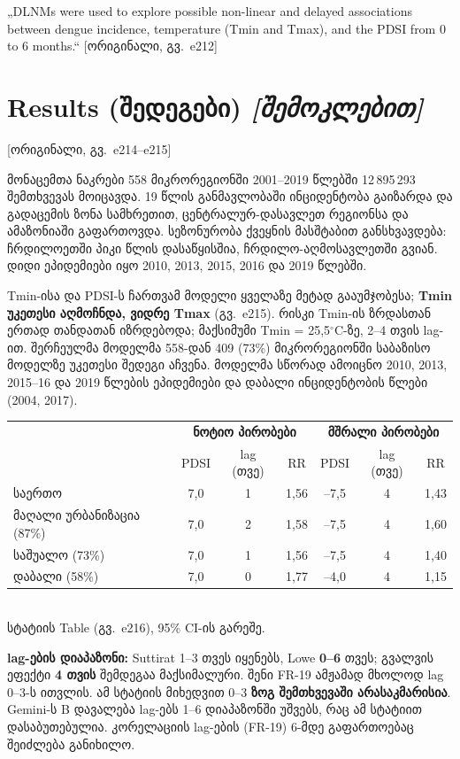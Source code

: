 \documentclass[11pt,a4paper]{article}
\newcommand{\imp}[1]{\textbf{\color{importred}#1}}
\newcommand{\pg}[1]{{\small\color{gray}[ორიგინალი, გვ.~#1]}}
\begin{document}
\begin{citat}
„DLNMs were used to explore possible non-linear and delayed associations between dengue incidence, temperature (Tmin and Tmax), and
the PDSI from 0 to 6 months.“ \pg{e212}
\end{citat}

\section{Results (შედეგები) \textit{[შემოკლებით]}} \pg{e214--e215}

მონაცემთა ნაკრები 558 მიკრორეგიონში 2001--2019 წლებში 12\,895\,293 შემთხვევას მოიცავდა. 19 წლის განმავლობაში ინციდენტობა
გაიზარდა და გადაცემის ზონა სამხრეთით, ცენტრალურ-დასავლეთ რეგიონსა და ამაზონიაში გაფართოვდა. სეზონურობა ქვეყნის მასშტაბით
განსხვავდება: ჩრდილოეთში პიკი წლის დასაწყისშია, ჩრდილო-აღმოსავლეთში გვიან. დიდი ეპიდემიები იყო 2010, 2013, 2015, 2016 და
2019 წლებში.

Tmin-ისა და PDSI-ს ჩართვამ მოდელი ყველაზე მეტად გააუმჯობესა; \textbf{Tmin უკეთესი აღმოჩნდა, ვიდრე Tmax} (გვ.~e215).
რისკი Tmin-ის ზრდასთან ერთად თანდათან იზრდებოდა; მაქსიმუმი Tmin = 25,5$^\circ$C-ზე, 2--4 თვის lag-ით. შერჩეულმა მოდელმა
558-დან 409 (73\%) მიკრორეგიონში საბაზისო მოდელზე უკეთესი შედეგი აჩვენა. მოდელმა სწორად ამოიცნო 2010, 2013, 2015--16 და 2019
წლების ეპიდემიები და დაბალი ინციდენტობის წლები (2004, 2017).

\begin{center}
\begin{tabular}{@{}lcccccc@{}}
\toprule
 & \multicolumn{3}{c}{\textbf{ნოტიო პირობები}} & \multicolumn{3}{c}{\textbf{მშრალი პირობები}}\\
 & PDSI & lag (თვე) & RR & PDSI & lag (თვე) & RR\\
\midrule
საერთო & 7,0 & 1 & 1,56 & --7,5 & 4 & 1,43\\
მაღალი ურბანიზაცია (87\%) & 7,0 & 2 & 1,58 & --7,5 & 4 & 1,60\\
საშუალო (73\%) & 7,0 & 1 & 1,56 & --7,5 & 4 & 1,40\\
დაბალი (58\%) & 7,0 & 0 & 1,77 & --4,0 & 4 & 1,15\\
\bottomrule
\end{tabular}\\[0.3em]
{\small სტატიის Table (გვ.~e216), 95\% CI-ის გარეშე.}
\end{center}

\begin{etl}
\textbf{lag-ების დიაპაზონი:} Suttirat 1--3 თვეს იყენებს, Lowe \textbf{0--6} თვეს; გვალვის ეფექტი \textbf{4 თვის} შემდეგაა
მაქსიმალური. შენი FR-19 ამჟამად მხოლოდ lag 0--3-ს ითვლის. ამ სტატიის მიხედვით 0--3 \imp{ზოგ შემთხვევაში არასაკმარისია}.
Gemini-ს B დავალება lag-ებს 1--6 დიაპაზონში უშვებს, რაც ამ სტატიით დასაბუთებულია. კორელაციის lag-ების (FR-19)
6-მდე გაფართოებაც შეიძლება განიხილო.
\end{etl}
\end{document}
